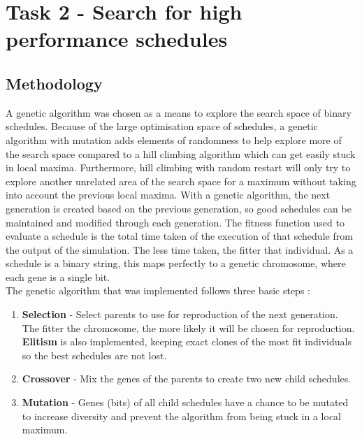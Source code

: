 \documentclass{article}
\newcommand{\n}[0]{\\[\baselineskip]}
\begin{document}
\section{Task 2 - Search for high performance schedules}

\subsection{Methodology}\label{sec:ga}
A genetic algorithm was chosen as a means to explore the search space of binary schedules. Because of the large optimisation space of schedules, a genetic algorithm with mutation adds elements of randomness to help explore more of the search space compared to a hill climbing algorithm which can get easily stuck in local maxima. Furthermore, hill climbing with random restart will only try to explore another unrelated area of the search space for a maximum without taking into account the previous local maxima. With a genetic algorithm, the next generation is created based on the previous generation, so good schedules can be maintained and modified through each generation. The fitness function used to evaluate a schedule is the total time taken of the execution of that schedule from the output of the simulation. The less time taken, the fitter that individual. As a schedule is a binary string, this maps perfectly to a genetic chromosome, where each gene is a single bit.
\n
The genetic algorithm that was implemented follows three basic steps \cite{ga}:
\begin{enumerate}
\item \textbf{Selection} - Select parents to use for reproduction of the next generation. The fitter the chromosome, the more likely it will be chosen for reproduction. \textbf{Elitism} is also implemented, keeping exact clones of the most fit individuals so the best schedules are not lost.
\item \textbf{Crossover} - Mix the genes of the parents to create two new child schedules.
\item \textbf{Mutation} - Genes (bits) of all child schedules have a chance to be mutated to increase diversity and prevent the algorithm from being stuck in a local maximum.
\end{enumerate}
\end{document}

